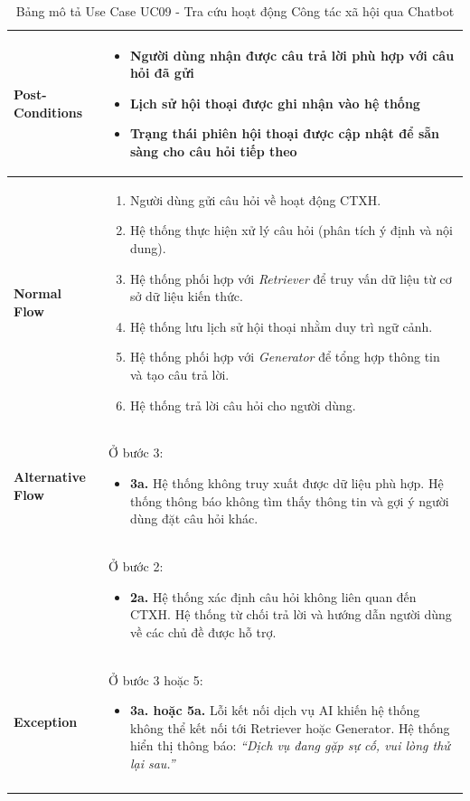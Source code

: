 \begin{longtable}{|m{}|m{}|}
\textbf{Post-Conditions} 
&
\begin{itemize}[label=--]
    \item Người dùng nhận được câu trả lời phù hợp với câu hỏi đã gửi
    \item Lịch sử hội thoại được ghi nhận vào hệ thống
    \item Trạng thái phiên hội thoại được cập nhật để sẵn sàng cho câu hỏi tiếp theo
\end{itemize}
\\ 
\hline

\textbf{Normal Flow} 
&
\begin{enumerate}
     \item Người dùng gửi câu hỏi về hoạt động CTXH.
    \item Hệ thống thực hiện xử lý câu hỏi (phân tích ý định và nội dung).
    \item Hệ thống phối hợp với \textit{Retriever} để truy vấn dữ liệu từ cơ sở dữ liệu kiến thức.
    \item Hệ thống lưu lịch sử hội thoại nhằm duy trì ngữ cảnh.
    \item Hệ thống phối hợp với \textit{Generator} để tổng hợp thông tin và tạo câu trả lời.
    \item Hệ thống trả lời câu hỏi cho người dùng.
\end{enumerate}
\\ 
\hline

\textbf{Alternative Flow} 
& Ở bước 3:
\begin{itemize}
    \item \textbf{3a.} Hệ thống không truy xuất được dữ liệu phù hợp. Hệ thống thông báo không tìm thấy thông tin và gợi ý người dùng đặt câu hỏi khác.
\end{itemize}
\\ 
& Ở bước 2:
\begin{itemize}
    \item \textbf{2a.} Hệ thống xác định câu hỏi không liên quan đến CTXH. Hệ thống từ chối trả lời và hướng dẫn người dùng về các chủ đề được hỗ trợ.
\end{itemize}
\\
\hline

\textbf{Exception} 
& Ở bước 3 hoặc 5:
\begin{itemize}
    \item \textbf{3a. hoặc 5a.} Lỗi kết nối dịch vụ AI khiến hệ thống không thể kết nối tới Retriever hoặc Generator. Hệ thống hiển thị thông báo: \textit{``Dịch vụ đang gặp sự cố, vui lòng thử lại sau.''}
\end{itemize}
\\
\hline
\caption{Bảng mô tả Use Case UC09 - Tra cứu hoạt động Công tác xã hội qua Chatbot}
\end{longtable}
